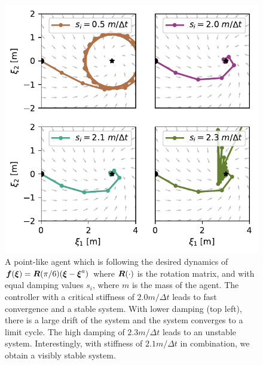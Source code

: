\begin{figure}[htb]
\centering
  \includegraphics[width=\columnwidth]{figures/discrete_controller_parameters_comparison_stable}
\caption{A point-like agent which is following the desired dynamics of
$\boldsymbol{f}(\boldsymbol{\xi}) = \boldsymbol{R}(\pi / 6) (\boldsymbol{\xi}  - \boldsymbol{\xi}^a)$ where $\boldsymbol{R}(\cdot)$ is the rotation matrix, and with equal damping values $s_i$, where $m$ is the mass of the agent.
The controller with a critical stiffness of $2.0 m / \Delta t$ leads to fast convergence and a stable system. With lower damping (top left), there is a large drift of the system and the system converges to a limit cycle. 
The high damping of $2.3 m / \Delta t$ leads to an unstable system. 
Interestingly, with stiffness of $2.1 m / \Delta t$ in combination, we obtain a visibly stable system.}
  \label{fig:discrete_controller_parameters_comparison_stable}
\end{figure}


% 
